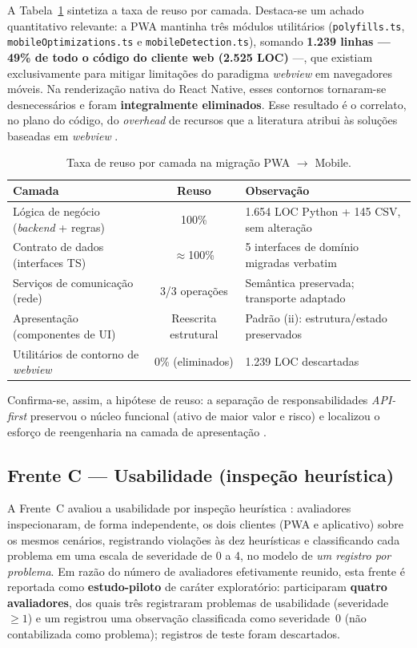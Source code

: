 A Tabela~\ref{tab:taxa_reuso} sintetiza a taxa de reuso por camada. Destaca-se um
achado quantitativo relevante: a PWA mantinha três módulos utilitários
(\texttt{polyfills.ts}, \texttt{mobileOptimizations.ts} e
\texttt{mobileDetection.ts}), somando \textbf{1.239 linhas --- 49\% de todo o
código do cliente web (2.525 LOC)} ---, que existiam exclusivamente para mitigar
limitações do paradigma \emph{webview} em navegadores móveis. Na renderização
nativa do React Native, esses contornos tornaram-se desnecessários e foram
\textbf{integralmente eliminados}. Esse resultado é o correlato, no plano do
código, do \emph{overhead} de recursos que a literatura atribui às soluções
baseadas em \emph{webview} \cite{oliveira2023}.

\begin{table}[H]
\centering
\caption{Taxa de reuso por camada na migração PWA $\rightarrow$ Mobile.}
\label{tab:taxa_reuso}
\footnotesize
\begin{tabular}{|p{4.6cm}|c|p{5.2cm}|}
\hline
\textbf{Camada} & \textbf{Reuso} & \textbf{Observação} \\ \hline
Lógica de negócio (\emph{backend} + regras) & 100\% & 1.654 LOC Python + 145 CSV, sem alteração \\ \hline
Contrato de dados (interfaces TS) & $\approx$100\% & 5 interfaces de domínio migradas verbatim \\ \hline
Serviços de comunicação (rede) & 3/3 operações & Semântica preservada; transporte adaptado \\ \hline
Apresentação (componentes de UI) & Reescrita estrutural & Padrão (ii): estrutura/estado preservados \\ \hline
Utilitários de contorno de \emph{webview} & 0\% (eliminados) & 1.239 LOC descartadas \\ \hline
\end{tabular}
\end{table}

Confirma-se, assim, a hipótese de reuso: a separação de responsabilidades
\emph{API-first} preservou o núcleo funcional (ativo de maior valor e risco) e
localizou o esforço de reengenharia na camada de apresentação
\cite{rampinelli2026, oliveira2023}.

\subsection{Frente C --- Usabilidade (inspeção heurística)}
\label{sub:frenteC}

A Frente~C avaliou a usabilidade por inspeção heurística \cite{nielsen1994,
cardieri2018}: avaliadores inspecionaram, de forma independente, os dois clientes
(PWA e aplicativo) sobre os mesmos cenários, registrando violações às dez
heurísticas e classificando cada problema em uma escala de severidade de 0 a 4, no
modelo de \emph{um registro por problema}. Em razão do número de avaliadores
efetivamente reunido, esta frente é reportada como \textbf{estudo-piloto} de
caráter exploratório: participaram \textbf{quatro avaliadores}, dos quais três
registraram problemas de usabilidade (severidade $\geq 1$) e um registrou uma
observação classificada como severidade~0 (não contabilizada como problema);
registros de teste foram descartados.

